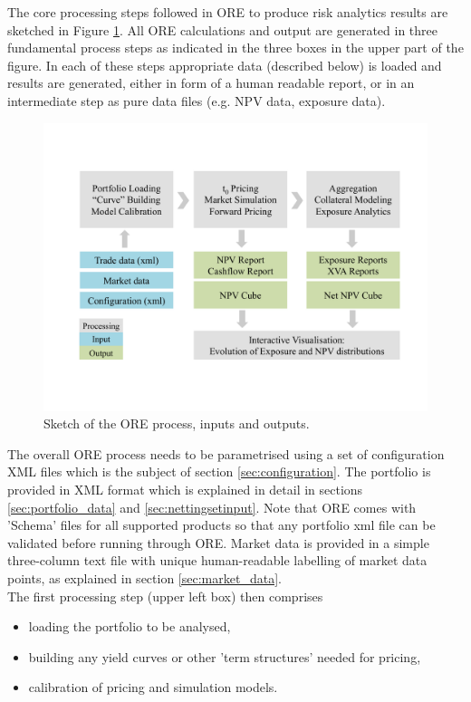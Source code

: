\documentclass[12pt, a4paper]{article}
\begin{document}
The core processing steps followed in ORE to produce risk analytics results are sketched in Figure \ref{fig_process}.
All ORE calculations and output are generated in three fundamental process steps as indicated in the three boxes in the
upper part of the figure. In each of these steps appropriate data (described below) is loaded and results are generated,
either in form of a human readable report, or in an intermediate step as pure data files (e.g. NPV data, exposure data).
\begin{figure}[h]
\begin{center}
\includegraphics[scale=0.6]{process.pdf}
\end{center}
\caption{Sketch of the ORE process, inputs and outputs. }
\label{fig_process}
\end{figure}

The overall ORE process needs to be parametrised using a set of configuration XML files which is the subject of section
\ref{sec:configuration}. The portfolio is provided in XML format which is explained in detail in sections
\ref{sec:portfolio_data} and \ref{sec:nettingsetinput}. Note that ORE comes with 'Schema' files for all supported
products so that any portfolio xml file can be validated before running through ORE. Market data is provided in a simple
three-column text file with unique human-readable labelling of market data points, as explained in section
\ref{sec:market_data}.  \\

The first processing step (upper left box) then comprises 
\begin{itemize}
\item loading the portfolio to be analysed, 
\item building any yield curves or other 'term structures' needed for pricing, 
\item calibration of pricing and simulation models.
\end{itemize}
\end{document}
